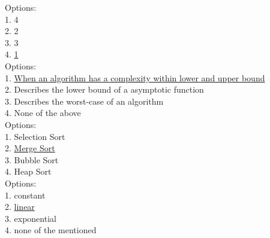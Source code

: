 \documentclass{report}
\begin{document}
\setlength{\parindent}{0pt}
Options:\\
1. 4\\
2. 2\\
3. 3\\
4. \underline{1}\\
\setlength{\parindent}{0pt}
Options:\\
1. \underline{When an algorithm has a complexity within lower and upper bound}\\
2. Describes the lower bound of a asymptotic function\\
3. Describes the worst-case of an algorithm\\
4. None of the above\\
\setlength{\parindent}{0pt}
Options:\\
1. Selection Sort\\
2. \underline{Merge Sort}\\
3. Bubble Sort\\
4. Heap Sort\\
\setlength{\parindent}{0pt}
Options:\\
1. constant\\
2. \underline{linear}\\
3. exponential\\
4. none of the mentioned\\

\newpage%
\pagebreak
\end{document}

